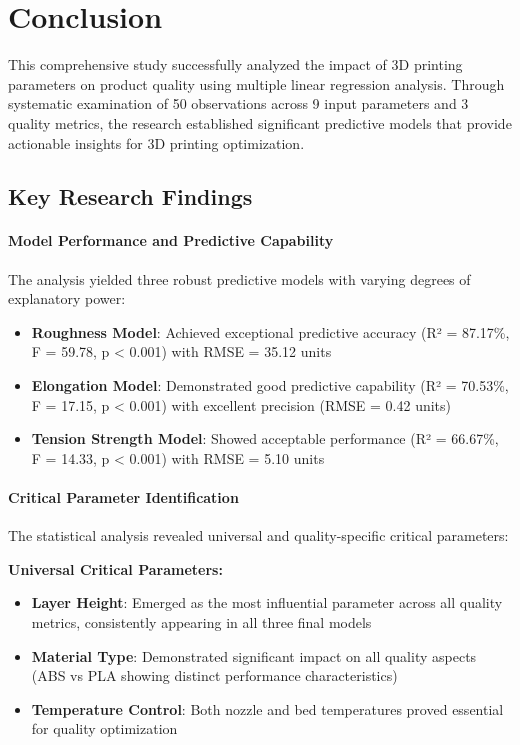 
\section{Conclusion}

This comprehensive study successfully analyzed the impact of 3D printing parameters on product quality using multiple linear regression analysis. Through systematic examination of 50 observations across 9 input parameters and 3 quality metrics, the research established significant predictive models that provide actionable insights for 3D printing optimization.

\subsection{Key Research Findings}

\paragraph{Model Performance and Predictive Capability}
The analysis yielded three robust predictive models with varying degrees of explanatory power:

\begin{itemize}
    \item \textbf{Roughness Model}: Achieved exceptional predictive accuracy (R² = 87.17\%, F = 59.78, p < 0.001) with RMSE = 35.12 units
    \item \textbf{Elongation Model}: Demonstrated good predictive capability (R² = 70.53\%, F = 17.15, p < 0.001) with excellent precision (RMSE = 0.42 units)
    \item \textbf{Tension Strength Model}: Showed acceptable performance (R² = 66.67\%, F = 14.33, p < 0.001) with RMSE = 5.10 units
\end{itemize}

\paragraph{Critical Parameter Identification}
The statistical analysis revealed universal and quality-specific critical parameters:

\textbf{Universal Critical Parameters:}
\begin{itemize}
    \item \textbf{Layer Height}: Emerged as the most influential parameter across all quality metrics, consistently appearing in all three final models
    \item \textbf{Material Type}: Demonstrated significant impact on all quality aspects (ABS vs PLA showing distinct performance characteristics)
    \item \textbf{Temperature Control}: Both nozzle and bed temperatures proved essential for quality optimization
\end{itemize}

